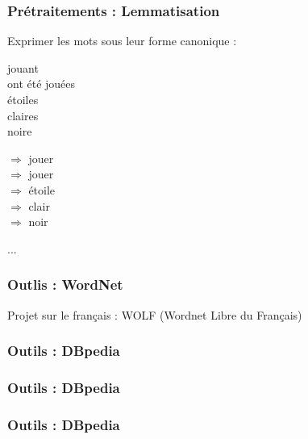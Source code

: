 \documentclass{formation}
\begin{document}
\begin{frame}
  \frametitle{Prétraitements : Lemmatisation}
  Exprimer les mots sous leur forme canonique : \\

  \begin{minipage}[l]{0.19\linewidth}
    jouant \\
    ont été jouées \\
    étoiles \\
    claires \\
    noire \\
  \end{minipage}\hfill
  \begin{minipage}[l]{0.80\linewidth}
  $\Rightarrow$ jouer \\
  $\Rightarrow$ jouer \\
  $\Rightarrow$ étoile \\
  $\Rightarrow$ clair \\
  $\Rightarrow$ noir  \\
  \end{minipage}\hfill
  ...
\end{frame}

\begin{frame}
  \frametitle{Outlis : WordNet}
  Projet sur le français : WOLF (Wordnet Libre du Français) 
\end{frame}

\begin{frame}
  \frametitle{Outils : DBpedia}
\end{frame}

\begin{frame}
  \frametitle{Outils : DBpedia}
\end{frame}

\begin{frame}
  \frametitle{Outils : DBpedia}
\end{frame}
\end{document}
